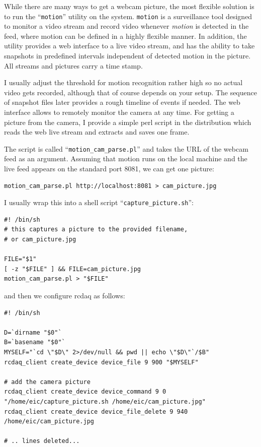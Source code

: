\documentclass{article}[11pt]
\begin{document}
While there are many ways to get a webcam picture, the most flexible
solution is to run the ``\verb|motion|'' utility on the
system. \verb|motion| is a surveillance tool designed to monitor a
video stream and record video whenever \emph{motion} is detected in
the feed, where motion can be defined in a highly flexible manner. In
addition, the utility provides a web interface to a live video stream,
and has the ability to take snapshots in predefined intervals
independent of detected motion in the picture. All streams and
pictures carry a time stamp.

I usually adjust the threshold for motion recognition rather high so
no actual video gets recorded, although that of course depends on your
setup. The sequence of snapshot files later provides a rough
timeline of events if needed. The web interface allows to remotely
monitor the camera at any time. For getting a picture from the camera,
I provide a simple perl script in the distribution which reads the web
live stream and extracts and saves one frame.

The script is called ``\verb|motion_cam_parse.pl|'' and takes the URL
of the webcam feed as an argument. Assuming that motion runs on the
local machine and the live feed appears on the standard port 8081, we can
get one picture:

\begin{verbatim}
motion_cam_parse.pl http://localhost:8081 > cam_picture.jpg
\end{verbatim}

I usually wrap this into a shell script ``\verb|capture_picture.sh|'':

\begin{verbatim}
#! /bin/sh
# this captures a picture to the provided filename,
# or cam_picture.jpg

FILE="$1"
[ -z "$FILE" ] && FILE=cam_picture.jpg
motion_cam_parse.pl > "$FILE"

\end{verbatim}

and then we configure rcdaq as follows:
\label{packet900}

\begin{verbatim} 
#! /bin/sh

D=`dirname "$0"`
B=`basename "$0"`
MYSELF="`cd \"$D\" 2>/dev/null && pwd || echo \"$D\"`/$B"
rcdaq_client create_device device_file 9 900 "$MYSELF"

# add the camera picture
rcdaq_client create_device device_command 9 0 "/home/eic/capture_picture.sh /home/eic/cam_picture.jpg"
rcdaq_client create_device device_file_delete 9 940 /home/eic/cam_picture.jpg

# .. lines deleted...
\end{verbatim}
\end{document}
